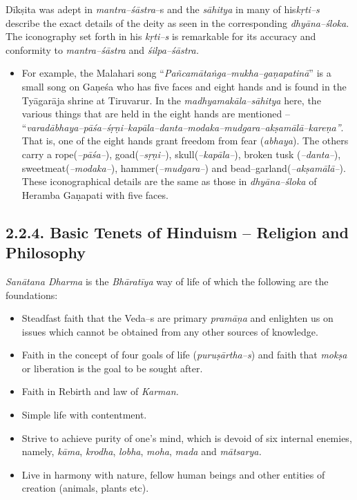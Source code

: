 Dīkṣita was adept in \textit{mantra–śāstra}–s and the \textit{sāhitya} in many of his\break \textit{kṛti–s} describe the exact details of the deity as seen in the corresponding \textit{dhyāna–śloka}. The iconography set forth in his \textit{kṛti–s} is remarkable for its accuracy and conformity to \textit{mantra–śāstra} and \textit{śilpa–śāstra.}

\begin{itemize}
\item For example, the Malahari song “\textit{Pañcamātaṅga–mukha–gaṇapa\-tinā}” is a small song on Gaṇeśa who has five faces and eight hands and is found in the Tyāgarāja shrine at Tiruvarur. In the \textit{madhyamakāla–sāhitya} here, the various things that are held in the eight hands are mentioned – “\textit{varadābhaya–pāśa–śṛṇi–kapāla–danta–modaka–mudgara–akṣamālā–kareṇa”}. That is, one of the eight hands grant freedom from fear (\textit{abhaya}). The others carry a rope(\textit{–pāśa–}), goad(\textit{–sṛṇi–}), skull(\textit{–kapāla–}), broken tusk (\textit{–danta–}), sweetmeat(\textit{–modaka–}), hammer(\textit{–mudgara–}) and bead–garland(\textit{–akṣamālā–}). These iconographical details are the same as those in \textit{dhyāna–śloka} of Heramba Gaṇapati with five faces.

\end{itemize}



\subsection*{2.2.4. Basic Tenets of Hinduism – Religion and Philosophy}

\textit{Sanātana Dharma} is the \textit{Bhāratīya} way of life of which the following are the foundations:

\vspace{-.4cm}

\begin{itemize}
\itemsep=0pt
\item Steadfast faith that the Veda–s are primary \textit{pramāṇa} and enlighten us on issues which cannot be obtained from any other sources of knowledge.

 \item Faith in the concept of four goals of life (\textit{puruṣārtha–s}) and faith that \textit{mokṣa} or liberation is the goal to be sought after.

 \item Faith in Rebirth and law of \textit{Karman.}

 \item Simple life with contentment.

 \item Strive to achieve purity of one’s mind, which is devoid of six internal enemies, namely, \textit{kāma}, \textit{krodha}, \textit{lobha}, \textit{moha}, \textit{mada} and \textit{mātsarya.}

 \item Live in harmony with nature, fellow human beings and other entities of creation (animals, plants etc).

\end{itemize}


